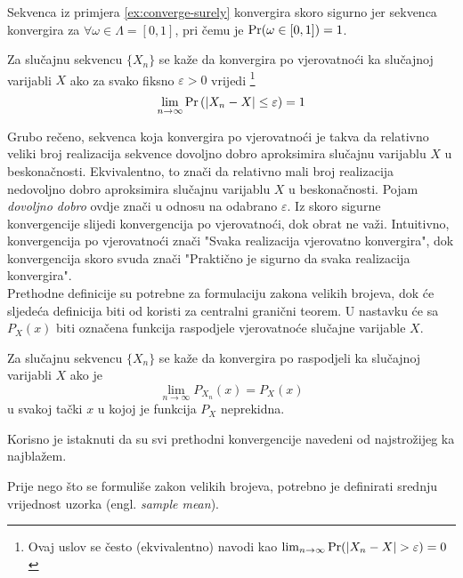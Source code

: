 Sekvenca iz primjera \ref{ex:converge-surely} konvergira skoro sigurno jer
sekvenca konvergira za $\forall \omega \in \Lambda = [0,1]$, pri čemu je
$\mathrm{Pr}(\omega \in [0,1]) = 1$.

\begin{definition}
  Za slučajnu sekvencu $\{X_n\}$ se kaže da konvergira po vjerovatnoći ka
  slučajnoj varijabli $X$ ako za svako fiksno $\varepsilon > 0$ vrijedi
  \footnote{
    Ovaj uslov se često (ekvivalentno) navodi kao
    $\lim_{n\to\infty} \pr(|X_n-X|>\varepsilon) = 0$
  }
  \begin{equation}
    \lim_{n\to\infty} \mathrm{Pr}\left(|X_n - X| \le \varepsilon\right) = 1
  \end{equation}
\end{definition}

Grubo rečeno, sekvenca koja konvergira po vjerovatnoći je takva da relativno
veliki broj realizacija sekvence dovoljno dobro aproksimira slučajnu varijablu
$X$ u beskonačnosti. Ekvivalentno, to znači da relativno mali broj realizacija
nedovoljno dobro aproksimira slučajnu varijablu $X$ u beskonačnosti. Pojam
\textit{dovoljno dobro} ovdje znači u odnosu na odabrano $\varepsilon$. Iz skoro
sigurne konvergencije slijedi konvergencija po vjerovatnoći, dok obrat ne važi.
Intuitivno, konvergencija po vjerovatnoći znači "Svaka realizacija vjerovatno
konvergira", dok konvergencija skoro svuda znači "Praktično je sigurno da svaka
realizacija konvergira". \\

Prethodne definicije su potrebne za formulaciju zakona velikih brojeva, dok će
sljedeća definicija biti od koristi za centralni granični teorem.  U nastavku će
sa $P_X(x)$ biti označena funkcija raspodjele vjerovatnoće slučajne varijable
$X$.

\begin{definition}
  Za slučajnu sekvencu $\{X_n\}$ se kaže da konvergira po raspodjeli ka
  slučajnoj varijabli $X$ ako je
  \begin{equation}
    \lim_{n\to\infty} P_{X_n}(x) = P_X(x)
  \end{equation}
  u svakoj tački $x$ u kojoj je funkcija $P_X$ neprekidna.
\end{definition}

Korisno je istaknuti da su svi prethodni konvergencije navedeni od najstrožijeg
ka najblažem.

Prije nego što se formuliše zakon velikih brojeva, potrebno je
definirati srednju vrijednost uzorka (engl. \textit{sample mean}).


